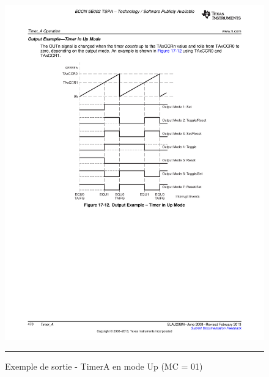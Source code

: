 \begin{figure}[t]
  \centering
  \includegraphics[angle=0, width=14cm]{./Figures/Chap5_Timer/Timer_Out1.pdf}
  \rule{35em}{0.5pt}
  \caption[Outmod_MC1]{Exemple de sortie - TimerA en mode Up (MC = 01)}
  \label{fig:Outmod_MC1}
\end{figure}

